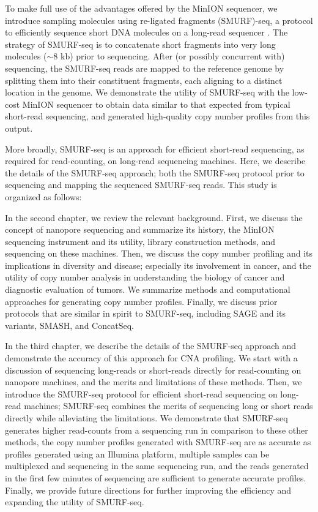 To make full use of the advantages offered by the MinION sequencer, we
introduce sampling molecules using re-ligated fragments (SMURF)-seq, a
protocol to efficiently sequence short DNA molecules on a long-read
sequencer \citep{prabakar2019smurf}. The strategy of SMURF-seq is to
concatenate short fragments into very long molecules ($\sim$8 kb) prior
to sequencing. After (or possibly concurrent with) sequencing, the
SMURF-seq reads are mapped to the reference genome by splitting them
into their constituent fragments, each aligning to a distinct location
in the genome.
%
We demonstrate the utility of SMURF-seq with the low-cost MinION
sequencer to obtain data similar to that expected from typical
short-read sequencing, and generated high-quality copy number profiles
from this output.

More broadly, SMURF-seq is an approach for efficient short-read
sequencing, as required for read-counting, on long-read sequencing
machines. Here, we describe the details of the SMURF-seq approach; both
the SMURF-seq protocol prior to sequencing and mapping the sequenced
SMURF-seq reads. This study is organized as follows:

In the second chapter, we review the relevant background.  First, we
discuss the concept of nanopore sequencing and summarize its history,
the MinION sequencing instrument and its utility, library construction
methods, and sequencing on these machines.
%
Then, we discuss the copy number profiling and its implications in
diversity and disease; especially its involvement in cancer, and the
utility of copy number analysis in understanding the biology of cancer
and diagnostic evaluation of tumors. We summarize methods and
computational approaches for generating copy number profiles.
%
Finally, we discuss prior protocols that are similar in spirit to
SMURF-seq, including SAGE and its variants, SMASH, and ConcatSeq.

In the third chapter, we describe the details of the SMURF-seq approach
and demonstrate the accuracy of this approach for CNA profiling.  We
start with a discussion of sequencing long-reads or short-reads directly
for read-counting on nanopore machines, and the merits and limitations
of these methods.
%
Then, we introduce the SMURF-seq protocol for efficient short-read
sequencing on long-read machines; SMURF-seq combines the merits of
sequencing long or short reads directly while alleviating the
limitations.
%
We demonstrate that SMURF-seq generates higher read-counts from a
sequencing run in comparison to these other methods, the copy number
profiles generated with SMURF-seq are as accurate as profiles generated
using an Illumina platform, multiple samples can be multiplexed and
sequencing in the same sequencing run, and the reads generated in the
first few minutes of sequencing are sufficient to generate accurate
profiles.
%
Finally, we provide future directions for further improving the
efficiency and expanding the utility of SMURF-seq.

